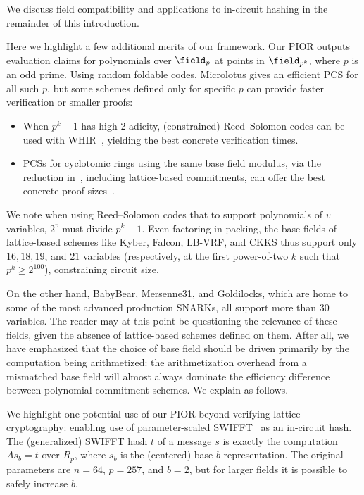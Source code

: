 We discuss field compatibility and applications to in-circuit hashing in the remainder of this introduction.

Here we highlight a few additional merits of our framework. Our PIOR outputs evaluation claims for polynomials over $\field_p$ at points in $\field_{p^k}$, where $p$ is an odd prime. Using random foldable codes, Microlotus gives an efficient PCS for all such $p$, but some schemes defined only for specific $p$ can provide faster verification or smaller proofs:
\begin{itemize}[nosep]
    \item When $p^k-1$ has high $2$-adicity, (constrained) Reed--Solomon codes can be used with WHIR~\cite{EPRINT:ACFY24}, yielding the best concrete verification times. 
    \item PCSs for cyclotomic rings using the same base field modulus, via the reduction in~\cite{hachi}, including lattice-based commitments, can offer the best concrete proof sizes~\cite{serval, hachi}.
\end{itemize}
We note when using Reed--Solomon codes that to support polynomials of $v$ variables, $2^v$ must divide $p^k-1$. Even factoring in packing, the base fields of lattice-based schemes like Kyber, Falcon, LB-VRF, and CKKS thus support only $16,18,19$, and $21$ variables (respectively, at the first power-of-two $k$ such that $p^k\geq 2^{100}$), constraining circuit size.

On the other hand, BabyBear, Mersenne31, and Goldilocks, which are home to some of the most advanced production SNARKs, all support more than $30$ variables. The reader may at this point be questioning the relevance of these fields, given the absence of lattice-based schemes defined on them. After all, we have emphasized that the choice of base field should be driven primarily by the computation being arithmetized: the arithmetization overhead from a mismatched base field will almost always dominate the efficiency difference between polynomial commitment schemes. We explain as follows.

We highlight one potential use of our PIOR beyond verifying lattice cryptography: enabling use of parameter-scaled SWIFFT~\cite{FSE:LMPR08} as an in-circuit hash. The (generalized) SWIFFT hash $t$ of a message $s$ is exactly the computation $As_b=t$ over $R_p$, where $s_b$ is the (centered) base-$b$ representation. The original parameters are $n=64$, $p=257$, and $b=2$, but for larger fields it is possible to safely increase $b$.

